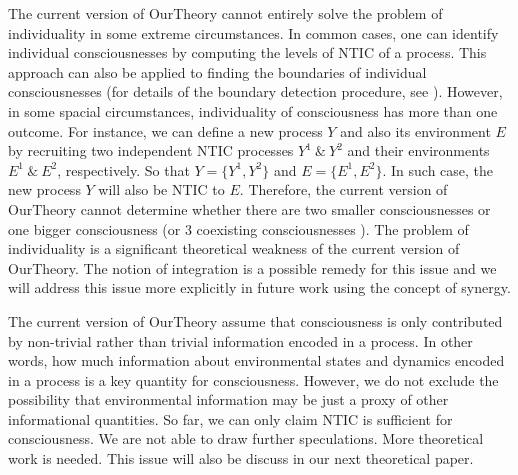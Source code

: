 \documentclass[utf8]{article}
\begin{document}
        
        The current version of \ac{OurTheory} cannot entirely solve the problem of individuality in some extreme circumstances. In common cases, one can identify individual consciousnesses by computing the levels of NTIC of a process. This approach can also be applied to finding the boundaries of individual consciousnesses (for details of the boundary detection procedure, see \cite{krakauer2014information}). However, in some spacial circumstances, individuality of consciousness has more than one outcome. For instance,
        we can define a new process $Y$ and also its environment $E$ by recruiting two independent NTIC processes $Y^1~\&~Y^2$ and their environments $E^1~\&~E^2$, respectively. So that $Y = \{Y^1,Y^2\}$ and $E=\{E^1,E^2\}$. In such case, the new process $Y$ will also be NTIC to $E$. Therefore, the current version of \ac{OurTheory} cannot determine whether there are two smaller consciousnesses or one bigger consciousness (or 3 coexisting consciousnesses ). The problem of individuality is a significant theoretical weakness of the current version of \ac{OurTheory}. The notion of integration is a possible remedy for this issue and we will address this issue more explicitly in future work using the concept of synergy.
        
        
        The current version of \ac{OurTheory} assume that consciousness is only contributed by  non-trivial rather than trivial information encoded in a process. In other words, how much information about environmental states and dynamics encoded in a process is a key quantity for consciousness. However, we do not exclude the possibility that environmental information may be just a proxy of other informational quantities. So far, we can only claim NTIC is sufficient for consciousness. We are not able to draw further speculations. More theoretical work is needed. This issue will also be discuss in our next theoretical paper. 
        
\end{document}
